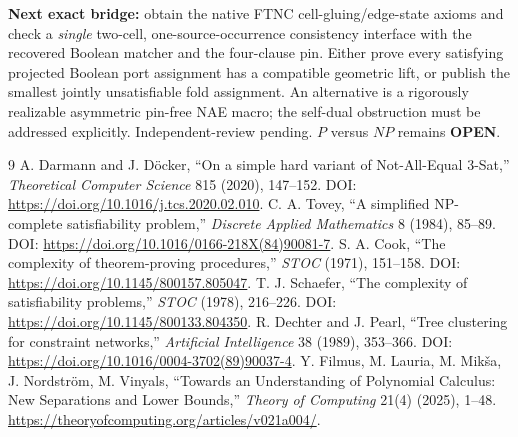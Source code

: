 \documentclass[11pt]{article}
\newcommand{\OPEN}{\textbf{OPEN}}
\begin{document}
\textbf{Next exact bridge:} obtain the native FTNC cell-gluing/edge-state
axioms and check a \emph{single} two-cell, one-source-occurrence consistency
interface with the recovered Boolean matcher and the four-clause pin.
Either prove every satisfying projected Boolean port assignment has a
compatible geometric lift, or publish the smallest jointly unsatisfiable
fold assignment.  An alternative is a rigorously realizable asymmetric
pin-free NAE macro; the self-dual obstruction must be addressed explicitly.
Independent-review pending.  $P$ versus $NP$ remains \OPEN.

\begin{thebibliography}{9}
 A. Darmann and J. D\"ocker, ``On a simple hard variant of Not-All-Equal 3-Sat,'' \emph{Theoretical Computer Science} 815 (2020), 147--152. DOI: \url{https://doi.org/10.1016/j.tcs.2020.02.010}.
 C. A. Tovey, ``A simplified NP-complete satisfiability problem,'' \emph{Discrete Applied Mathematics} 8 (1984), 85--89. DOI: \url{https://doi.org/10.1016/0166-218X(84)90081-7}.
 S. A. Cook, ``The complexity of theorem-proving procedures,'' \emph{STOC} (1971), 151--158. DOI: \url{https://doi.org/10.1145/800157.805047}.
 T. J. Schaefer, ``The complexity of satisfiability problems,'' \emph{STOC} (1978), 216--226. DOI: \url{https://doi.org/10.1145/800133.804350}.
 R. Dechter and J. Pearl, ``Tree clustering for constraint networks,'' \emph{Artificial Intelligence} 38 (1989), 353--366. DOI: \url{https://doi.org/10.1016/0004-3702(89)90037-4}.
 Y. Filmus, M. Lauria, M. Mik\v{s}a, J. Nordstr\"om, M. Vinyals, ``Towards an Understanding of Polynomial Calculus: New Separations and Lower Bounds,'' \emph{Theory of Computing} 21(4) (2025), 1--48. \url{https://theoryofcomputing.org/articles/v021a004/}.
\end{thebibliography}
\end{document}
